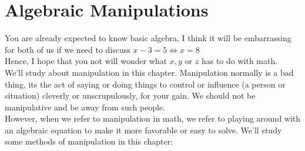 \chapter{Algebraic Manipulations}
You are already expected to know basic algebra, I think it will be embarrassing for both of us if we need to discuss $x-3=5 \iff x=8$\\ Hence, I hope that you not will wonder what $x,y$ or $z$ has to do with math.\\
We'll study about manipulation in this chapter. Manipulation normally is a bad thing, its the act of saying or doing things to control or influence (a person or situation) cleverly or unscrupulously, for your gain. We should not be manipulative and be away from such people.\\
However, when we refer to manipulation in math, we refer to playing around with an algebraic equation to make it more favorable or easy to solve. We'll study some methods of manipulation in this chapter: 
